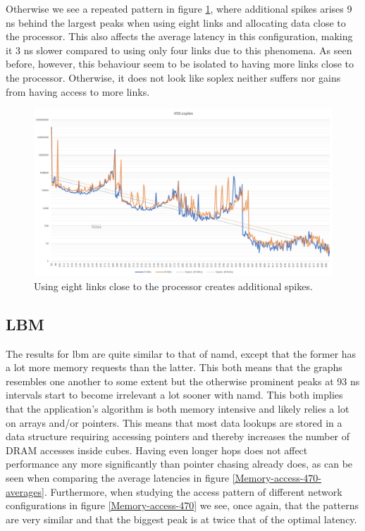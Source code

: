 Otherwise we see a repeated pattern in figure \ref{Memory-access-450-2-dev-4-8-links}, where additional spikes arises 9 ns behind the largest peaks when using eight links and allocating data close to the processor. This also affects the average latency in this configuration, making it 3 ns slower compared to using only four links due to this phenomena. As seen before, however, this behaviour seem to be isolated to having more links close to the processor. Otherwise, it does not look like soplex neither suffers nor gains from having access to more links. 

\begin{figure}[!h]
    \centering
    \includegraphics[width=0.75\linewidth]{figure/450-2.4-8.jpg}
    \caption{Using eight links close to the processor creates additional spikes.}
    \label{Memory-access-450-2-dev-4-8-links}
\end{figure}

\subsection{LBM}
The results for lbm are quite similar to that of namd, except that the former has a lot more memory requests than the latter. This both means that the graphs resembles one another to some extent but the otherwise prominent peaks at 93 ns intervals start to become irrelevant a lot sooner with namd. This both implies that the application's algorithm is both memory intensive and likely relies a lot on arrays and/or pointers. This means that most data lookups are stored in a data structure requiring accessing pointers and thereby increases the number of DRAM accesses inside cubes. Having even longer hops does not affect performance any more significantly than pointer chasing already does, as can be seen when comparing the average latencies in figure \ref{Memory-access-470-averages}. Furthermore, when studying the access pattern of different network configurations in figure \ref{Memory-access-470} we see, once again, that the patterns are very similar and that the biggest peak is at twice that of the optimal latency.
\bigskip

